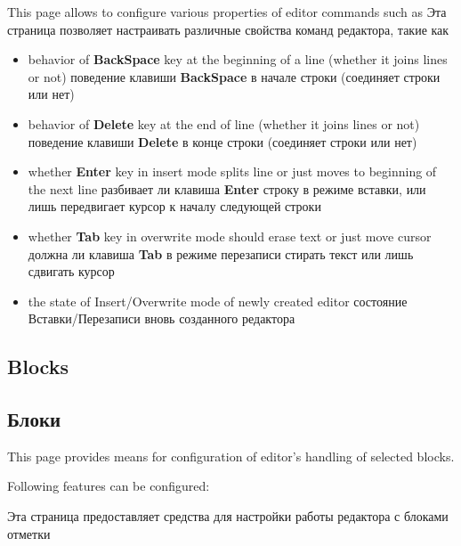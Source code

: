 \ifenglish
This page allows to configure various properties of editor commands such as
\else
Эта страница позволяет настраивать различные свойства команд редактора, такие
как
\fi
\begin{itemize}
\item \ifenglish
      behavior of {\bf BackSpace} key at the beginning of a line (whether it joins lines or not)
     \else
      поведение клавиши {\bf BackSpace} в начале строки (соединяет строки или нет)
     \fi
\item \ifenglish
      behavior of {\bf Delete} key at the end of line (whether it joins lines or not)
    \else 
      поведение клавиши {\bf Delete} в конце строки (соединяет строки или нет)
      \fi
\item \ifenglish
      whether {\bf Enter} key in insert mode splits line or just moves to beginning of
      the next line
      \else
      разбивает ли клавиша {\bf Enter} строку в режиме вставки, или лишь
      передвигает курсор к началу следующей строки
      \fi
\item \ifenglish
      whether {\bf Tab} key in overwrite mode should erase text or just move cursor
     \else
      должна ли клавиша {\bf Tab} в режиме перезаписи стирать текст или лишь
       сдвигать курсор
      \fi
\item \ifenglish
      the state of Insert/Overwrite mode of newly created editor
      \else
      состояние Вставки/Перезаписи вновь созданного редактора
      \fi
\end{itemize}

\ifenglish
\subsection{Blocks}
\else
\subsection{Блоки}
\fi
{}

\ifenglish
This page provides means for configuration of editor's handling of selected blocks.

Following features can be configured:

\else
Эта страница предоставляет средства для настройки работы редактора с блоками
отметки

